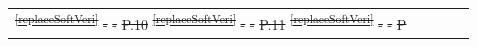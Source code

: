 \documentclass[a4paper,12pt,twoside]{article}
\providecommand{\DIFdeltex}[1]{{\protect\color{red}\sout{#1}}}                      %
\providecommand{\DIFaddbegin}{} %
\providecommand{\DIFdelend}{} %
\providecommand{\DIFdel}[1]{\texorpdfstring{\DIFdeltex{#1}}{}} %
\newcommand{\DIFaddincludegraphics}[2][]{{\color{blue}\fbox{\DIFOincludegraphics[#1]{#2}}}} %
\DeclareRobustCommand{\DIFaddbegin}{\DIFOaddbegin \let\includegraphics\DIFaddincludegraphics} %
\DeclareRobustCommand{\DIFdelend}{\DIFOaddend \let\includegraphics\DIFOincludegraphics} %
\begin{document}
\begin{longtable}[]{|m{}| m{} |m{} |m{}|m{}|}
\DIFdel{\textsuperscript{\ref{replaceSoftVeri}}                                                                        }%
\DIFdel{-    }%
\DIFdel{-        }%
\DIFdel{P.10 }%
\DIFdel{\textsuperscript{\ref{replaceSoftVeri}}                                                                  }%
\DIFdel{-    }%
\DIFdel{-        }%
\DIFdel{P.11 }%
\DIFdel{\textsuperscript{\ref{replaceSoftVeri}}                                                                 }%
\DIFdel{-    }%
\DIFdel{-      }%
\DIFdel{P}\DIFdelend \DIFaddbegin 



\end{longtable}
\end{document}
